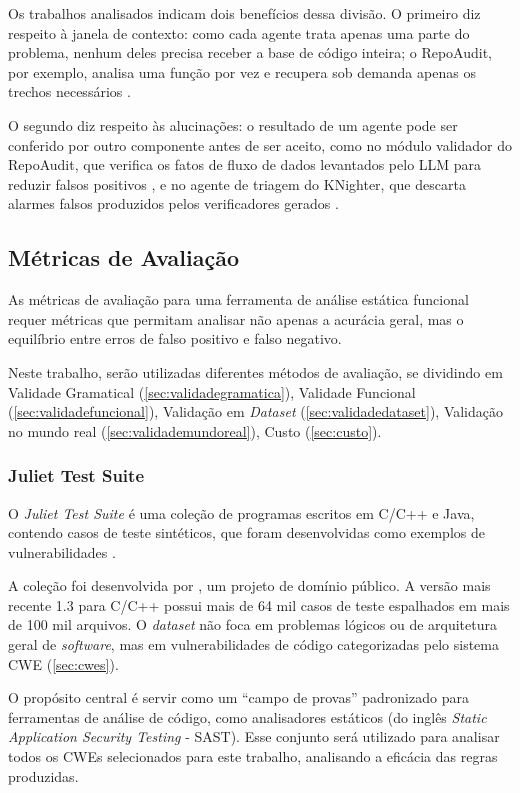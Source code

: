 \documentclass[
    12pt,                %
    openright,           %
    oneside,             %
    a4paper,             %
    english,             %
    brazil               %
]{abntex2}
\begin{document}
\par
Os trabalhos analisados indicam dois benefícios dessa divisão.
O primeiro diz respeito à janela de contexto: como cada agente trata apenas uma parte do problema, nenhum deles precisa receber a base de código inteira; o RepoAudit, por exemplo, analisa uma função por vez e recupera sob demanda apenas os trechos necessários \cite{guo2025repoaudit}.
\par
O segundo diz respeito às alucinações: o resultado de um agente pode ser conferido por outro componente antes de ser aceito, como no módulo validador do RepoAudit, que verifica os fatos de fluxo de dados levantados pelo LLM para reduzir falsos positivos \cite{guo2025repoaudit}, e no agente de triagem do KNighter, que descarta alarmes falsos produzidos pelos verificadores gerados \cite{yang2025knighter}.

\subsection{Métricas de Avaliação}
\label{sec:metricasavaliacao}
\par
As métricas de avaliação para uma ferramenta de análise estática funcional requer métricas que permitam analisar não apenas a acurácia geral, mas o equilíbrio entre erros de falso positivo e falso negativo. 
\par
Neste trabalho, serão utilizadas diferentes métodos de avaliação, se dividindo em Validade Gramatical (\ref{sec:validadegramatica}), Validade Funcional (\ref{sec:validadefuncional}), Validação em \textit{Dataset} (\ref{sec:validadedataset}), Validação no mundo real (\ref{sec:validademundoreal}), Custo (\ref{sec:custo}).

\subsubsection{Juliet Test Suite}
\label{sec:juliet}
\par
O \textit{Juliet Test Suite} é uma coleção de programas escritos em C/C++ e Java, contendo casos de teste sintéticos, que foram desenvolvidas como exemplos de vulnerabilidades \cite{nistsard112juliet}.
\par
A coleção foi desenvolvida por , um projeto de domínio público.
A versão mais recente 1.3 para C/C++ possui mais de 64 mil casos de teste espalhados em mais de 100 mil arquivos.
O \textit{dataset} não foca em problemas lógicos ou de arquitetura geral de \textit{software}, mas em vulnerabilidades de código categorizadas pelo sistema CWE (\ref{sec:cwes}).
\par
O propósito central é servir como um ``campo de provas'' padronizado para ferramentas de análise de código, como analisadores estáticos (do inglês \textit{Static Application Security Testing} - SAST).
Esse conjunto será utilizado para analisar todos os CWEs selecionados para este trabalho, analisando a eficácia das regras produzidas.
\end{document}

